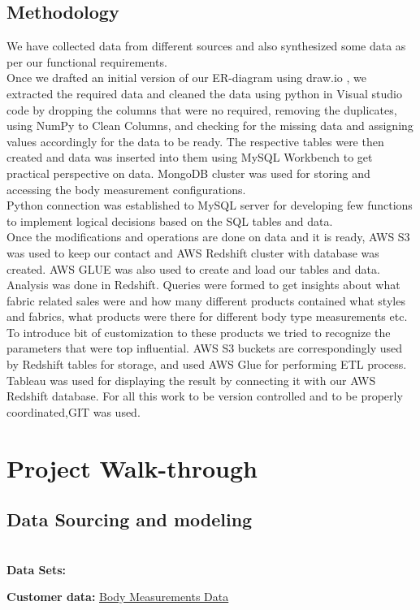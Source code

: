 \documentclass[11pt,journal,compsoc]{IEEEtran}
\begin{document}
\subsection{Methodology}
We have collected data from different sources and also synthesized some data as per our functional requirements. \\
Once we drafted an initial version of our  ER-diagram using draw.io , we extracted the required data and cleaned the data using python in Visual studio code by dropping the columns that were no required, removing the duplicates, using NumPy to Clean Columns, and checking for the missing data and assigning values accordingly for the data to be ready. The respective tables were then created and data was inserted into them using MySQL Workbench to get practical perspective on data. MongoDB cluster was used for storing and accessing the body measurement configurations.\\
Python connection was established to MySQL server for developing few functions to implement logical decisions based on the SQL tables and data. \\
Once the modifications and operations are done on data and it is ready, AWS S3 was used to keep our contact and AWS Redshift cluster with database was created. AWS GLUE was also used to create and load our tables and data. Analysis was done in Redshift. Queries were formed to get insights about what fabric related sales were and how many different products contained what styles and fabrics, what products were there for different body type measurements etc. To introduce bit of customization to these products we tried to recognize the parameters that were top influential. AWS S3 buckets are correspondingly used by Redshift tables for storage, and used AWS Glue for performing ETL process.  \\
Tableau was used for displaying the result by connecting it with our AWS Redshift database. For all this work to be version controlled and to be properly coordinated,GIT was used.
\section{Project Walk-through}
\subsection{Data Sourcing and modeling} \\
\textbf{Data Sets:}\

\textbullet \textbf{Customer data:} \href{https://data.mendeley.com/datasets/bjv6c9pmp4/1}{ Body Measurements Data}\
\end{document}
